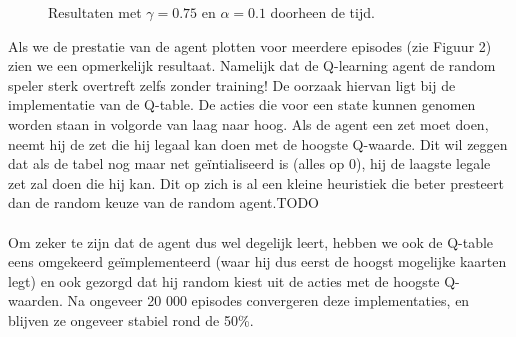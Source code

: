 \documentclass[11pt]{article}
\begin{document}
\begin{figure}[H]
    \centering
    \qquad
    \caption{Resultaten met $\gamma = 0.75$ en $\alpha = 0.1$ doorheen de tijd.}
    \label{fig:example}
\end{figure}
\noindent Als we de prestatie van de agent plotten voor meerdere episodes (zie Figuur 2) zien we een opmerkelijk resultaat. Namelijk dat de Q-learning agent de random speler sterk overtreft zelfs zonder training! De oorzaak hiervan ligt bij de implementatie van de Q-table. De acties die voor een state kunnen genomen worden staan in volgorde van laag naar hoog. Als de agent een zet moet doen, neemt hij de zet die hij legaal kan doen met de hoogste Q-waarde. Dit wil zeggen dat als de tabel nog maar net geïntialiseerd is (alles op 0), hij de laagste legale zet zal doen die hij kan. Dit op zich is al een kleine heuristiek die beter presteert dan de random keuze van de random agent.TODO \\\\
Om zeker te zijn dat de agent dus wel degelijk leert, hebben we ook de Q-table eens omgekeerd geïmplementeerd (waar hij dus eerst de hoogst mogelijke kaarten legt) en ook gezorgd dat hij random kiest uit de acties met de hoogste Q-waarden. Na ongeveer 20 000 episodes convergeren deze implementaties, en blijven ze ongeveer stabiel rond de 50\%.
\end{document}
